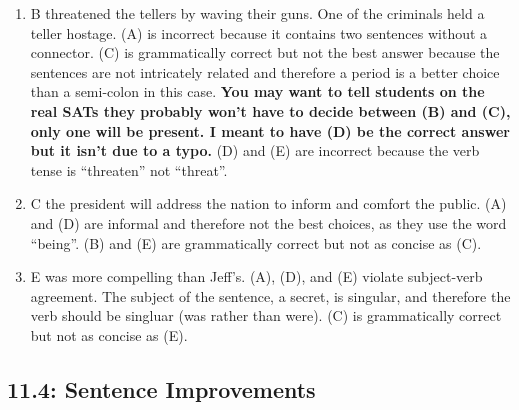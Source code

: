 \begin{enumerate}
\item B threatened the tellers by waving their guns. One of the criminals held a teller hostage. (A) is incorrect because it contains two sentences without a connector. (C) is grammatically correct but not the best answer because the sentences are not intricately related and therefore a period is a better choice than a semi-colon in this case. \textbf{You may want to tell students on the real SATs they probably won't have to decide between (B) and (C), only one will be present. I meant to have (D) be the correct answer but it isn't due to a typo.} (D) and (E) are incorrect because the verb tense is ``threaten'' not ``threat''.
\item C the president will address the nation to inform and comfort the public. (A) and (D) are informal and therefore not the best choices, as they use the word ``being''. (B) and (E) are grammatically correct but not as concise as (C). 
\item E was more compelling than Jeff's. (A), (D), and (E) violate subject-verb agreement. The subject of the sentence, a secret, is singular, and therefore the verb should be singluar (was rather than were). (C) is grammatically correct but not as concise as (E). 
\end{enumerate}

\subsection{11.4: Sentence Improvements}


